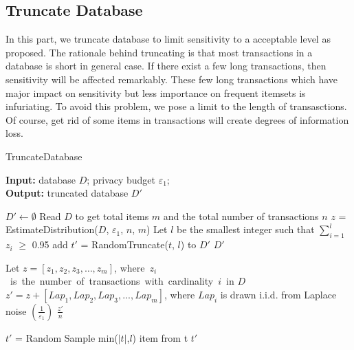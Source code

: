 \documentclass[conference]{IEEEtran}
\begin{document}
\subsection{Truncate Database}
In this part, we truncate database to limit sensitivity to a acceptable level as \cite{b6} proposed.
The rationale behind truncating is that most transactions in a database is short in general case.
If there exist a few long transactions, then sensitivity will be affected remarkably.
These few long transactions which have major impact on sensitivity but less importance on frequent itemsets is infuriating.
To avoid this problem, we pose a limit to the length of transasctions. 
Of course, get rid of some items in transactions will create degrees of information loss.
\begin{algorithm}[htbp]
    \caption{TruncateDatabase} 
    \hspace*{0.02in} {\bf Input:} 
    database $D$; privacy budget $\varepsilon_1$;\\
    \hspace*{0.02in} {\bf Output:} %
    truncated database $D'$
    
    \begin{algorithmic}[1]
    \State $D'\leftarrow \emptyset$
    \State Read $D$ to get total items $m$ and the total number of transactions $n$
    \State $z$ = {EstimateDistribution}{($D$, $\varepsilon_1$, $n$, $m$)}
    \State Let $l$ be the smallest integer such that  $\sum_{i=1}^l$$z_i$ $\ge$ 0.95
        \State add $t'$ = RandomTruncate($t$, $l$) to $D'$
    \EndFor 
    \State \Return $D'$
    
    \State Let $z = [ z_1, z_2, z_3,\dots,z_m]$, 
    where\ $z_i$\ is\ the\ number\ of\ transactions\ with\ cardinality\ $i$\ in $D$
    \State $z' = z + [Lap_1,Lap_2,Lap_3,...,Lap_m]$, where $Lap_i$ is drawn i.i.d. from Laplace noise $(\frac{1}{\varepsilon_1})$    
    \State \Return $\frac{z'}{n}$
    \EndFunction

    \State $t'$ = Random Sample min({$|t|$,$l$}) item from t
    \State \Return $t'$
    \EndFunction 
    \end{algorithmic}
    \label{alg1}
\end{algorithm}
\end{document}
